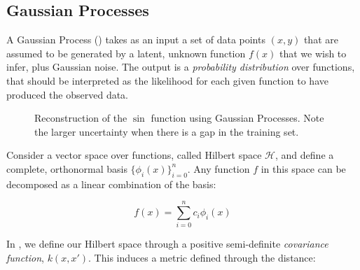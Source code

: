\subsection{Gaussian Processes}
A Gaussian Process (\GP) takes as an input a set of data points $(x, y)$ that are assumed to be generated by a latent, unknown function $f(x)$ that we wish to infer, plus Gaussian noise. The output is a \emph{probability distribution} over functions, that should be interpreted as the likelihood for each given function to have produced the observed data.


\begin{figure}[htb]
	\centering
	\hfill
	\caption{Reconstruction of the $\sin$ function using Gaussian Processes.
	Note the larger uncertainty when there is a gap in the training set.}\label{fig:gp_toy}
\end{figure}


Consider a vector space over functions,  called Hilbert space $\mathscr{H}$, and define a complete, orthonormal basis $\{\phi_i(x)\}_{i=0}^{n}$.
Any function $f$ in this space can be decomposed as a linear combination of the basis:

 \[f(x) = \sum_{i=0}^{n} c_i \phi_i(x)\]
 
In \GP, we define our Hilbert space through a positive semi-definite \emph{covariance function}, $k(x, x')$.
This induces a metric defined through the distance:

